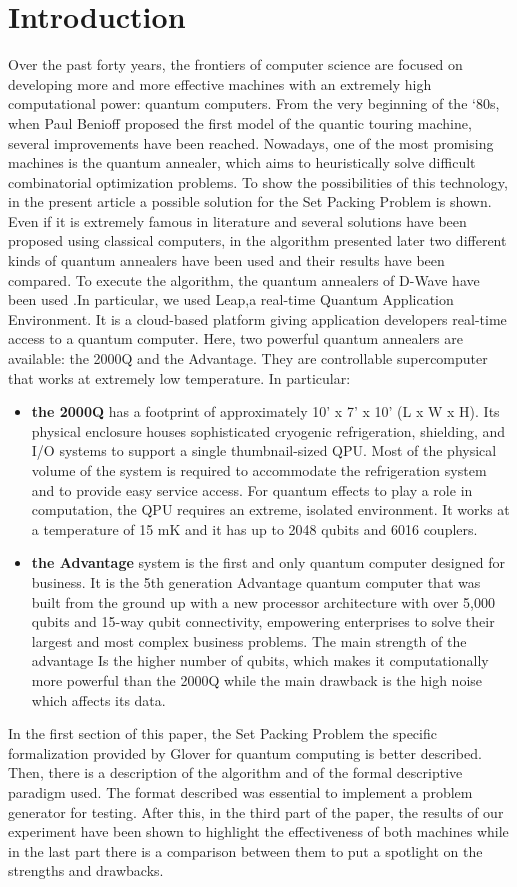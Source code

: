 \documentclass[oneside,a4paper]{article}
\begin{document}
\section{Introduction}
Over the past forty years, the frontiers of computer science are focused on developing more and more effective machines with an extremely high computational power: quantum computers. From the very beginning of the ‘80s, when Paul Benioff proposed the first model of the quantic touring machine, several improvements have been reached. Nowadays, one of the most promising machines is the quantum annealer, which aims to heuristically solve difficult combinatorial optimization problems. To show the possibilities of this technology, in the present article a possible solution for the Set Packing Problem is shown. Even if it is extremely famous in literature and several solutions have been proposed using classical computers, in the algorithm presented later two different kinds of quantum annealers have been used and their results have been compared.
To execute the algorithm, the quantum annealers of D-Wave have been used \cite{article1}.In particular, we used Leap,a real-time Quantum Application Environment. It is a cloud-based platform giving application developers real-time access to a quantum computer. Here, two powerful quantum annealers are available: the 2000Q and the Advantage. They are controllable supercomputer that works at extremely low temperature. In particular: 
\begin{itemize}
    \item \textbf{the 2000Q} has a footprint of approximately 10' x 7' x 10' (L x W x H). Its physical enclosure houses sophisticated cryogenic refrigeration, shielding, and I/O systems to support a single thumbnail-sized QPU.  Most of the physical volume of the system is required to accommodate the refrigeration system 
and to provide easy service access.  For quantum effects to play a role in computation, the QPU requires an extreme, isolated environment. It works at a temperature of 15 mK and it has up to 2048 qubits and 6016 couplers.
    \item \textbf{the Advantage} system is the first and only quantum computer designed for business. 
It is the 5th generation Advantage quantum computer that was built from the ground up with 
a new processor architecture with over 5,000 qubits and 15-way qubit connectivity, empowering enterprises to solve their largest and most complex business problems. The main strength of the advantage Is the higher number of qubits, which makes it computationally more powerful than the 2000Q while the main drawback is the high noise which affects its data.
\end{itemize}
In the first section of this paper, the Set Packing Problem the specific formalization provided by Glover for quantum computing\cite{Website1} is better described. Then, there is a description of the algorithm and of the formal descriptive paradigm used. The format described was essential to implement a problem generator for testing. After this, in the third part of the paper, the results of our experiment have been shown to highlight the effectiveness of both machines while in the last part there is a comparison between them to put a spotlight on the strengths and drawbacks.
\end{document}
